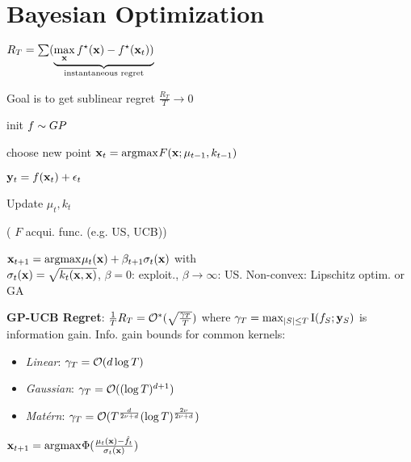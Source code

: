\section{Bayesian Optimization}

\begin{definition}[Regret]
    \(R_T = \sum(\underbrace{\max_{\vb{x}} f^\star(\vb{x}) - f^\star(\vb{x}_t))}_{\text{instantaneous regret}}\)

    Goal is to get sublinear regret \(\frac{R_T}{T} \to 0\)
\end{definition}

\begin{definition}[BO-GP]
    \begin{enumerate*}
        \item init \(f \sim GP\)
        \item choose new point \(\vb{x}_t = \text{argmax}_{}F(\vb{x}; \mu_{t-1}, k_{t-1})\)
        \item \(\vb{y}_t = f(\vb{x}_t) + \epsilon_t\)
        \item Update \(\mu_t, k_t\)
    \end{enumerate*}
    ({\color{H5} \(F\) acqui. func. (e.g. US, UCB)})
\end{definition}

\begin{definition}[UCB]
    \(\vb{x}_{t+1} = \text{argmax}_{} \mu_t(\vb{x}) + \beta_{t+1} \sigma_t(\vb{x})\) with \\ \(\sigma_t(\vb{x}) = \sqrt{k_t(\vb{x},\vb{x})}\), \(\beta=0\): exploit., \(\beta \to \infty\): US.
    {\color{H4} Non-convex: Lipschitz optim. or GA}
\end{definition}

\begin{colored}
    \textbf{GP-UCB Regret}: \(\frac{1}{T}R_T = \mathcal{O}^*(\sqrt{\frac{\gamma_T}{T}})\) where
    \(\gamma_T = \max_{|S| \leq T} \operatorname{I}(f_S; \vb{y}_S)\) is information gain.
    Info. gain bounds for common kernels:
    \begin{itemize}
        \item \textit{Linear}: \(\gamma_T = \mathcal{O}(d \log T)\)
        \item \textit{Gaussian}: \(\gamma_T = \mathcal{O}((\log T)^{d+1})\)
        \item \textit{Matérn}: \(\gamma_T = \mathcal{O}(T^{\frac{d}{2\nu + d}} (\log T)^{\frac{2\nu}{2\nu + d}})\)
    \end{itemize}
\end{colored}

\begin{definition}[PI]
    \(\vb{x}_{t+1} = \text{argmax}_{} \Phi(\frac{\mu_t(\vb{x}) - \hat f_t}{\sigma_t(\vb{x})})\)
\end{definition}

